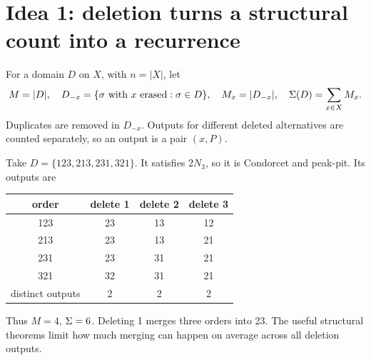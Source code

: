 \section{Idea 1: deletion turns a structural count into a recurrence}\label{sec:deletion}
\begin{definition}\label{def:deletion}
For a domain \(D\) on \(X\), with \(n=|X|\), let
\[
 M=|D|,\quad D_{-x}=\{\sigma\text{ with }x\text{ erased}:\sigma\in D\},
 \quad M_x=|D_{-x}|,\quad\Sigma(D)=\sum_{x\in X}M_x.
\]
Duplicates are removed in \(D_{-x}\). Outputs for different deleted
alternatives are counted separately, so an output is a pair \((x,P)\).
\end{definition}

\begin{example}\label{ex:four}
Take \(D=\{123,213,231,321\}\). It satisfies \(2N_3\), so it is
Condorcet and peak-pit. Its outputs are
\begin{center}
\begin{tabular}{c|ccc}\toprule
order & delete 1 & delete 2 & delete 3\\\midrule
123&23&13&12\\213&23&13&21\\231&23&31&21\\321&32&31&21\\\midrule
distinct outputs&2&2&2\\\bottomrule
\end{tabular}
\end{center}
Thus \(M=4\), \(\Sigma=6\). Deleting 1 merges three orders into 23.
The useful structural theorems limit how much merging can happen on
average across all deletion outputs.
\end{example}


